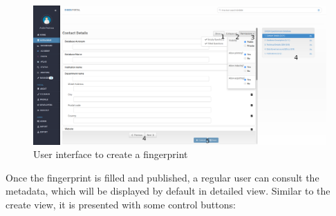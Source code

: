 \begin{figure}
    \center
    \includegraphics[width=\textwidth]{fingerprint-new}
    \caption{User interface to create a fingerprint}
    \label{fig:fingerprint-new}
\end{figure}

Once the fingerprint is filled and published, a regular user can consult the metadata, which will be displayed by default in detailed view.
Similar to the create view, it is presented with some control buttons:

